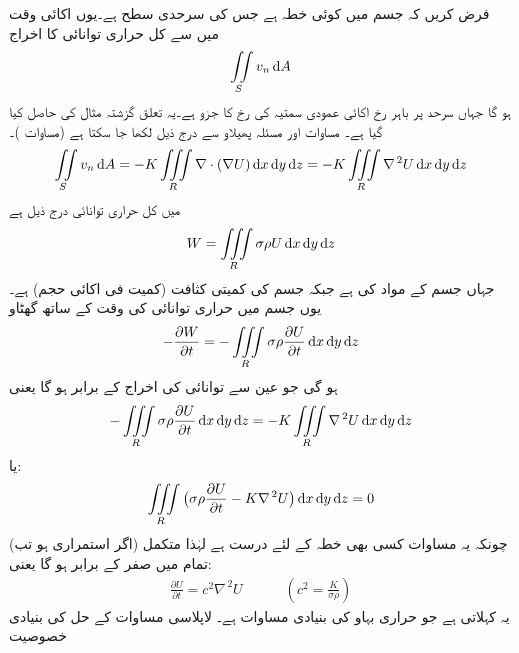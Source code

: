 فرض کریں کہ جسم میں  کوئی خطہ ہے جس کی سرحدی سطح  ہے۔یوں اکائی وقت میں  سے کل حراری توانائی کا اخراج
\begin{align*}
\iint\limits_S v_n \dif A
\end{align*}
ہو گا جہاں  سرحد  پر باہر رخ اکائی عمودی سمتیہ  کی رخ   کا جزو ہے۔یہ تعلق گزشتہ مثال کی حاصل کیا گیا ہے۔ مساوات  اور مسئلہ پھیلاو سے درج ذیل لکھا جا سکتا ہے (مساوات )۔
\begin{align}
\iint\limits_S v_n \dif A=-K\iiint\limits_R \nabla \cdot (\nabla U)\dif x\dif y\dif z=-K\iiint\limits_R \nabla^{\,2}U \dif x\dif y\dif z
\end{align}
  میں کل حراری توانائی  درج ذیل ہے
\begin{align*}
W=\iiint\limits_R \sigma \rho U \dif x\dif y\dif z
\end{align*}
جہاں  جسم کے مواد کی  ہے جبکہ  جسم کی کمیتی کثافت (کمیت فی اکائی حجم) ہے۔یوں جسم میں حراری توانائی کی وقت کے ساتھ گھٹاو 
\begin{align*}
-\frac{\partial W}{\partial t}=-\iiint\limits_R \sigma \rho \frac{\partial U}{\partial t} \dif x\dif y\dif z
\end{align*}
ہو گی جو عین  سے توانائی کی اخراج کے برابر ہو گا یعنی
\begin{align*}
-\iiint\limits_R \sigma \rho \frac{\partial U}{\partial t} \dif x\dif y\dif z=-K\iiint\limits_R \nabla^{\,2}U \dif x\dif y\dif z
\end{align*} 
یا:
\begin{align*}
\iiint\limits_R \big(\sigma \rho\frac{\partial U}{\partial t}-K\nabla^{\,2}U\big)\dif x\dif y\dif z=0
\end{align*}
 چونکہ یہ مساوات کسی بھی خطہ  کے لئے درست ہے لہٰذا متکمل (اگر استمراری ہو تب) تمام  میں صفر کے برابر ہو گا یعنی:
\begin{align}\label{مساوات_خطی_تکمل_حراری_مساوات}
\frac{\partial U}{\partial t}=c^2\nabla^{\,2}U\quad \quad \quad (c^2=\frac{K}{\sigma \rho})
\end{align}
یہ  کہلاتی ہے جو حراری بہاو کی بنیادی مساوات ہے۔
\quad لاپلاسی مساوات کے حل کی بنیادی خصوصیت\\
